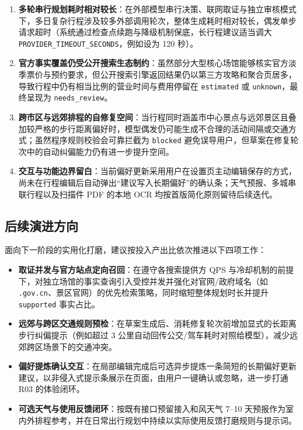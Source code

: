 \begin{enumerate}
  \item \textbf{多轮串行规划耗时相对较长}：在外部模型串行决策、联网取证与独立审核模式下，多日复杂行程涉及较多外部调用轮次，整体生成耗时相对较长，偶发单步请求超时（系统通过检查点续跑与降级机制保底，长行程建议适当调大 \texttt{PROVIDER\_TIMEOUT\_SECONDS}，例如设为 120 秒）。
  \item \textbf{官方事实覆盖仍受公开搜索生态制约}：虽然部分大型核心场馆能够核实官方淡季票价与预约要求，但公开搜索引擎返回结果仍以第三方攻略和聚合页居多，导致行程中仍有相当比例的营业时间与费用停留在 \texttt{estimated} 或 \texttt{unknown}，最终呈现为 \texttt{needs\_review}。
  \item \textbf{跨市区与远郊排程的自修复空间}：当行程同时涵盖市中心景点与远郊景区且叠加较严格的步行距离偏好时，模型偶发仍可能生成不合理的活动间隔或交通方式；虽然程序规则校验会可靠拦截为 \texttt{blocked} 避免误导用户，但草案在修复轮次中的自动纠偏能力仍有进一步提升空间。
  \item \textbf{交互与功能边界留白}：当前偏好更新采用用户在设置页主动编辑保存的方式，尚未在行程编辑后自动弹出“建议写入长期偏好”的确认条；天气预报、多城串联行程以及扫描件 PDF 的本地 OCR 均按首版简化原则留待后续迭代。
\end{enumerate}

\subsection{后续演进方向}

面向下一阶段的实用化打磨，建议按投入产出比依次推进以下四项工作：

\begin{itemize}
  \item \textbf{取证并发与官方站点定向召回}：在遵守各搜索提供方 QPS 与冷却机制的前提下，对独立场馆的事实查询引入受控并发并强化对官网/政府域名（如 \texttt{.gov.cn}、景区官网）的优先检索策略，同时缩短整体规划时长并提升 \texttt{supported} 事实占比。
  \item \textbf{远郊与跨区交通规则预检}：在草案生成后、消耗修复轮次前增加显式的长距离步行纠偏提示（例如超过 3 公里自动回传公交/驾车耗时对照给模型），减少远郊跨区场景下的交通冲突。
  \item \textbf{偏好提炼确认交互}：在局部编辑完成后可选异步提炼一条简短的长期偏好更新建议，以非侵入式提示条展示在页面，由用户一键确认或忽略，进一步打通 R03 的体验闭环。
  \item \textbf{可选天气与使用反馈闭环}：按既有接口预留接入和风天气 7--10 天预报作为室内外排程参考，并在日常出行规划中持续以实际使用反馈打磨规则与提示词。
\end{itemize}
